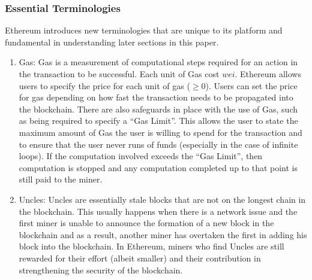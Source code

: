 \documentclass[a4paper,12pt]{article}
\begin{document}
{\subsubsection{Essential Terminologies}
{\par Ethereum introduces new terminologies that are unique to its platform and fundamental in understanding later sections in this paper.}
\begin{enumerate}
	\item Gas: Gas is a measurement of computational steps required for an action in the transaction to be successful. Each unit of Gas cost $wei$. Ethereum allows users to specify the price for each unit of gas ($\geq0$). Users can set the price for gas depending on how fast the transaction needs to be propagated into the blockchain. There are also safeguards in place with the use of Gas, such as being required to specify a ``Gas Limit''. This allows the user to state the maximum amount of Gas the user is willing to spend for the transaction and to ensure that the user never runs of funds (especially in the case of infinite loops). If the computation involved exceeds the ``Gas Limit'', then computation is stopped and any computation completed up to that point is still paid to the miner.
	\item Uncles: Uncles are essentially stale blocks that are not on the longest chain in the blockchain. This usually happens when there is a network issue and the first miner is unable to announce the formation of a new block in the blockchain and as a result, another miner has overtaken the first in adding his block into the blockchain. In Ethereum, miners who find Uncles are still rewarded for their effort (albeit smaller) and their contribution in strengthening the security of the blockchain.
\end{enumerate}
}
\end{document}
